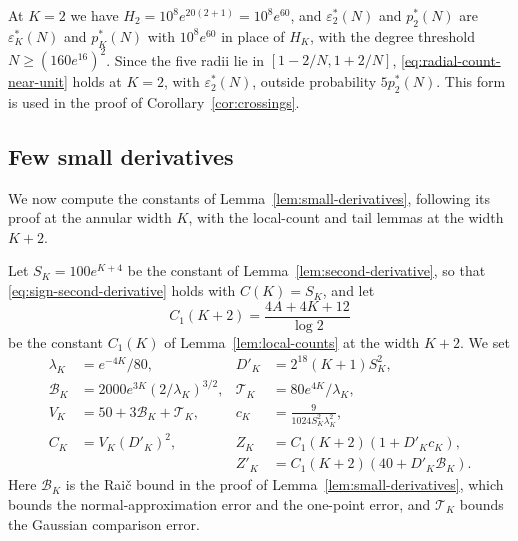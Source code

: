 At $K=2$ we have $H_2=10^8e^{20(2+1)}=10^8e^{60}$, and
$\varepsilon_2^*(N)$ and $p_2^*(N)$ are $\varepsilon_K^*(N)$ and
$p_K^*(N)$ with $10^8e^{60}$ in place of $H_K$, with the degree
threshold $N\ge(160e^{16})^2$. Since the five radii lie in
$[1-2/N,1+2/N]$, \eqref{eq:radial-count-near-unit} holds at $K=2$, with
$\varepsilon_2^*(N)$, outside probability $5p_2^*(N)$.
This form is used in the proof of Corollary~\ref{cor:crossings}.

\subsection{Few small derivatives}\label{app:const-small-derivatives}
We now compute the constants of Lemma~\ref{lem:small-derivatives},
following its proof at the annular width $K$, with the local-count and
tail lemmas at the width $K+2$.

Let $S_K=100e^{K+4}$ be the constant of
Lemma~\ref{lem:second-derivative}, so that
\eqref{eq:sign-second-derivative} holds with $C(K)=S_K$, and let
\[
 C_1(K+2)=\frac{4A+4K+12}{\log2}
\]
be the constant $C_1(K)$ of Lemma~\ref{lem:local-counts} at the width
$K+2$. We set
\begin{align*}
 \lambda_K&=e^{-4K}/80,&
 D'_K&=2^{18}(K+1)S_K^2,\\
 \mathcal B_K&=2000e^{3K}(2/\lambda_K)^{3/2},&
 \mathcal T_K&=80e^{4K}/\lambda_K,\\
 V_K&=50+3\mathcal B_K+\mathcal T_K,&
 c_K&=\frac9{1024S_K^2\lambda_K^2},\\
 C_K&=V_K(D'_K)^2,&
 Z_K&=C_1(K+2)(1+D'_Kc_K),\\
 & & Z'_K&=C_1(K+2)(40+D'_K\mathcal B_K).
\end{align*}
Here $\mathcal B_K$ is the Rai\v{c} bound in the proof of
Lemma~\ref{lem:small-derivatives}, which bounds the normal-approximation
error and the one-point error, and $\mathcal T_K$ bounds the Gaussian
comparison error.

